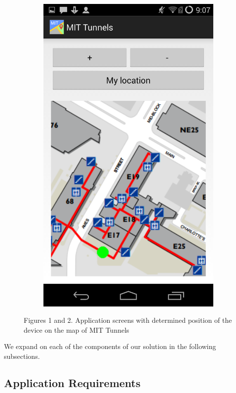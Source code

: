 \documentclass[11pt]{article}
\begin{document}
\begin{figure}[h]
\begin{subfigure}[b]{0.45\textwidth}
\includegraphics[width=\textwidth]{ScreenshotTunnels2}
\label{fig:app2}
\end{subfigure}
\caption{Figures 1 and 2. Application screens with determined position of the device on the map of MIT Tunnels}
\end{figure}
We expand on each of the components of our solution in the following subsections.
\subsection{Application Requirements}
\end{document}
